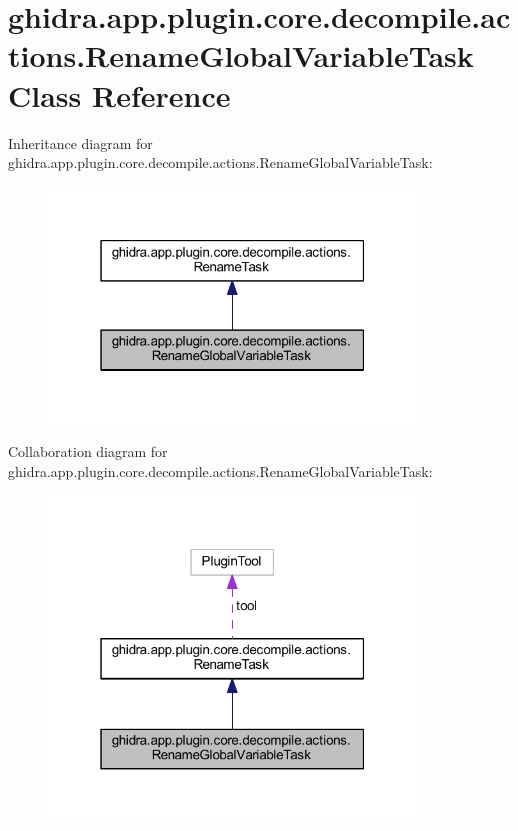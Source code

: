 \hypertarget{classghidra_1_1app_1_1plugin_1_1core_1_1decompile_1_1actions_1_1_rename_global_variable_task}{}\section{ghidra.\+app.\+plugin.\+core.\+decompile.\+actions.\+Rename\+Global\+Variable\+Task Class Reference}
\label{classghidra_1_1app_1_1plugin_1_1core_1_1decompile_1_1actions_1_1_rename_global_variable_task}


Inheritance diagram for ghidra.\+app.\+plugin.\+core.\+decompile.\+actions.\+Rename\+Global\+Variable\+Task\+:
\nopagebreak
\begin{figure}[H]
\begin{center}
\leavevmode
\includegraphics[width=277pt]{classghidra_1_1app_1_1plugin_1_1core_1_1decompile_1_1actions_1_1_rename_global_variable_task__inherit__graph}
\end{center}
\end{figure}


Collaboration diagram for ghidra.\+app.\+plugin.\+core.\+decompile.\+actions.\+Rename\+Global\+Variable\+Task\+:
\nopagebreak
\begin{figure}[H]
\begin{center}
\leavevmode
\includegraphics[width=277pt]{classghidra_1_1app_1_1plugin_1_1core_1_1decompile_1_1actions_1_1_rename_global_variable_task__coll__graph}
\end{center}
\end{figure}
